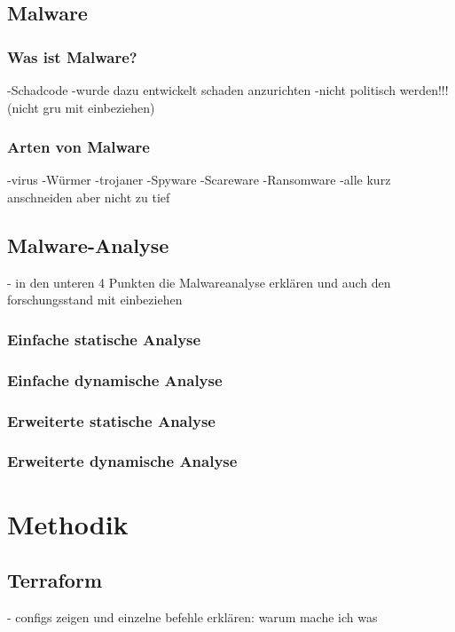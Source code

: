 \documentclass[12pt,oneside]{article}
\begin{document}
\subsection{Malware}
\subsubsection{Was ist Malware?}
-Schadcode 
\newline
-wurde dazu entwickelt schaden anzurichten
\newline
-nicht politisch werden!!! (nicht gru mit einbeziehen)
\subsubsection{Arten von Malware}
-virus
\newline
-Würmer
\newline
-trojaner
\newline
-Spyware
\newline
-Scareware
\newline
-Ransomware
\newline
-alle kurz anschneiden aber nicht zu tief
\subsection{Malware-Analyse}
- in den unteren 4 Punkten die Malwareanalyse erklären und auch den forschungsstand mit einbeziehen
\subsubsection{Einfache statische Analyse}
\subsubsection{Einfache dynamische Analyse}
\subsubsection{Erweiterte statische Analyse}
\subsubsection{Erweiterte dynamische Analyse}
\newpage

\section{Methodik}
\subsection{Terraform}
- configs zeigen und einzelne befehle erklären: warum mache ich was
\end{document}
